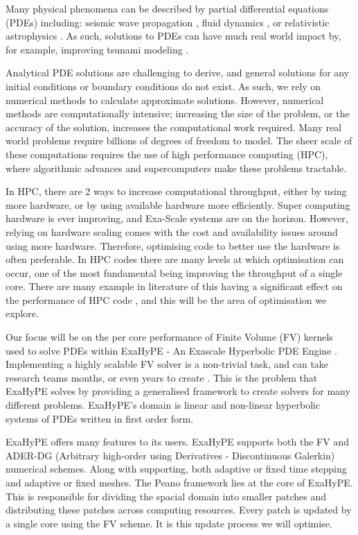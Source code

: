 Many physical phenomena can be described by partial differential equations (PDEs) including:  seismic wave propagation \cite{earthquakePDE}, fluid dynamics \cite{exahype}, or relativistic astrophysics \cite{relativisticPDE}.
As such, solutions to PDEs can have much real world impact by, for example, improving tsunami modeling \cite{tsunamiPDE}.


Analytical PDE solutions are challenging to derive, and general solutions for any initial conditions or boundary conditions do not exist.
As such, we rely on numerical methods to calculate approximate solutions.
However, numerical methods are computationally intensive; increasing the size of the problem, or the accuracy of the solution, increases the computational work required.
Many real world problems require billions of degrees of freedom to model.
The sheer scale of these computations requires the use of high performance computing (HPC), where algorithmic advances and supercomputers make these problems tractable.

In HPC, there are 2 ways to increase computational throughput, either by using more hardware, or by using available hardware more efficiently.
Super computing hardware is ever improving, and Exa-Scale systems are on the horizon.
However, relying on hardware scaling comes with the cost and availability issues around using more hardware.
Therefore, optimising code to better use the hardware is often preferable.
In HPC codes there are many levels at which optimisation can occur, one of the most fundamental being improving the throughput of a single core.
There are many example in literature of this having a significant effect on the performance of HPC code \cite{YATeTo,seisolPFLOP,codegen_dg_SIMD}, and this will be the area of optimisation we explore.     

Our focus will be on the per core performance of Finite Volume (FV) kernels used to solve PDEs within ExaHyPE - An Exascale Hyperbolic PDE Engine \cite{exahype}.
Implementing a highly scalable FV solver is a non-trivial task, and can take research teams months, or even years to create \cite{tensorChemistry}.
This is the problem that ExaHyPE solves by providing a generalised framework to create solvers for many different problems.
ExaHyPE's domain is linear and non-linear hyperbolic systems of PDEs written in first order form.

ExaHyPE offers many features to its users.
ExaHyPE supports both the FV and ADER-DG (Arbitrary high-order using Derivatives - Discontinuous Galerkin) numerical schemes.
Along with supporting, both adaptive or fixed time stepping and adaptive or fixed meshes.
The Peano framework \cite{PeanoFramework} lies at the core of ExaHyPE.
This is responsible for dividing the spacial domain into smaller patches and distributing these patches across computing resources.
Every patch is updated by a single core using the FV scheme.
It is this update process we will optimise.

